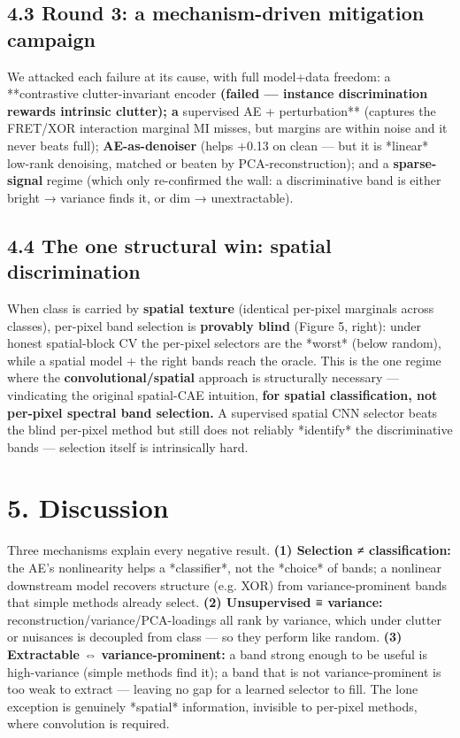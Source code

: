 \documentclass[11pt]{article}
\begin{document}
\subsection*{4.3 Round 3: a mechanism-driven mitigation campaign}
We attacked each failure at its cause, with full model+data freedom: a **contrastive clutter-invariant
encoder\textbf{ (failed — instance discrimination rewards intrinsic clutter); a }supervised AE + perturbation**
(captures the FRET/XOR interaction marginal MI misses, but margins are within noise and it never beats
full); \textbf{AE-as-denoiser} (helps +0.13 on clean — but it is *linear* low-rank denoising, matched or
beaten by PCA-reconstruction); and a \textbf{sparse-signal} regime (which only re-confirmed the wall: a
discriminative band is either bright → variance finds it, or dim → unextractable).
\subsection*{4.4 The one structural win: spatial discrimination}
When class is carried by \textbf{spatial texture} (identical per-pixel marginals across classes), per-pixel
band selection is \textbf{provably blind} (Figure 5, right): under honest spatial-block CV the per-pixel
selectors are the *worst* (below random), while a spatial model + the right bands reach the oracle. This
is the one regime where the \textbf{convolutional/spatial} approach is structurally necessary — vindicating
the original spatial-CAE intuition, \textbf{for spatial classification, not per-pixel spectral band selection.}
A supervised spatial CNN selector beats the blind per-pixel method but still does not reliably *identify*
the discriminative bands — selection itself is intrinsically hard.
\section*{5. Discussion}
Three mechanisms explain every negative result. \textbf{(1) Selection ≠ classification:} the AE's nonlinearity
helps a *classifier*, not the *choice* of bands; a nonlinear downstream model recovers structure (e.g.
XOR) from variance-prominent bands that simple methods already select. \textbf{(2) Unsupervised ≡ variance:}
reconstruction/variance/PCA-loadings all rank by variance, which under clutter or nuisances is decoupled
from class — so they perform like random. \textbf{(3) Extractable ⇔ variance-prominent:} a band strong enough
to be useful is high-variance (simple methods find it); a band that is not variance-prominent is too weak
to extract — leaving no gap for a learned selector to fill. The lone exception is genuinely *spatial*
information, invisible to per-pixel methods, where convolution is required.
\end{document}
